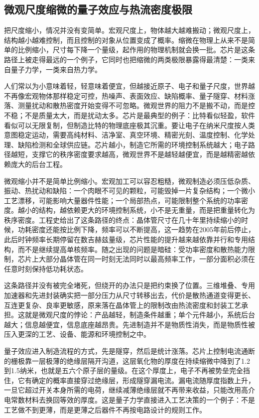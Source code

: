 \subsection{微观尺度缩微的量子效应与热流密度极限}

把尺度缩小，情况并没有变简单。宏观尺度上，物体越大越难搬动；微观尺度上，结构越小越难控制，而且控制的对象从位置变成了概率。缩微在物理上从来不是简单的比例缩小，尺寸每下降一个量级，起作用的物理机制就会换一批。芯片是这条路径上被走得最远的一个例子，它同时也把缩微的两类极限暴露得最清楚：一类来自量子力学，一类来自热力学。


人们常以为小意味着轻，轻意味着便宜，但越接近原子、电子和量子尺度，世界越不再像宏观物体那样稳定可控，热噪声、表面效应、缺陷概率、量子隧穿、材料涨落、测量扰动和散热密度开始变得不可忽略。微观世界的阻力不是搬不动，而是控不稳；不是质量太大，而是扰动太多。芯片是最典型的例子：比特看似轻盈，软件看似可以无限复制，但制造比特的物理底座极其沉重。要让电子在纳米尺度按人类意图稳定运动，需要高纯材料、洁净室、真空环境、精密光刻、温度控制、化学处理、缺陷检测和全球供应链。芯片越小，制造它所需的环境控制系统越大；电子路径越短，支撑它的秩序密度要求越高，微观世界不是越轻越便宜，而是越精密越依赖庞大的后台工程。

微观缩小并不是简单比例缩小。宏观加工可以容忍粗糙，微观制造必须压低杂质、振动、热扰动和缺陷：一个肉眼不可见的颗粒，可能毁掉一片复杂结构；一个微小工艺漂移，可能影响大量器件性能；一个局部热点，可能限制整个系统的功率密度。越小的结构，越依赖更大的环境控制系统，小不是无重量，而是把重量转化为秩序密度。工程史给出了这条路径的终点：晶体管尺寸在几十年里持续缩小的时候，功耗密度还能按比例下降，频率可以不断提高，这一趋势在2005年前后停止，此后时钟频率长期停留在数吉赫兹量级，芯片性能的提升越来越依靠并行和专用结构，而不是继续提高单核频率。\cite{esmaeilzadeh2011dark}随之出现的问题是暗硅：受功率密度和散热能力限制，芯片上大部分晶体管在同一时刻无法同时以最高频率工作，一部分面积必须在任意时刻保持低功耗状态。\cite{esmaeilzadeh2011dark}

这条路径并没有被完全堵死，但绕开的办法只是把约束换了位置。三维堆叠、专用加速器和先进封装确实把一部分压力从尺寸转移出去，代价是散热通道变得更长、互连更复杂、良率更敏感，原来落在晶体管上的限制改由热流密度和封装工艺承担。这就是微观尺度的悖论：产品越轻，制造条件越重；单个元件越小，系统后台越大；信息越便宜，信息底座越昂贵。先进制造并不是物质性消失，而是物质性被压入更深的工艺、设备、能源和环境控制之中。


量子效应进入制造流程的方式，先是隧穿，然后是统计涨落。芯片上控制电流通断的栅极靠一层极薄的绝缘层隔开沟道，这层氧化物的厚度在持续缩微中降到了1.2到1.5纳米，也就是五六个原子层的量级。在这个厚度上，电子不再被势垒完全挡住，它有确定的概率直接穿过绝缘层，形成隧穿漏电流。漏电流随厚度指数上升，一旦它超过开关本身所需的电荷，继续减薄绝缘层就不再带来收益，只能改用高介电常数材料去换回等效的厚度。这是量子力学直接进入工艺决策的一个例子：不是工艺做不到更薄，而是更薄之后器件不再按电路设计的规则工作。

